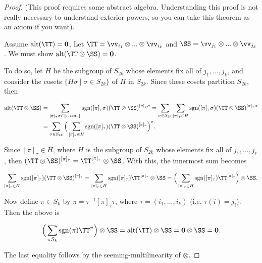 \begin{proof}
    \newcommand{\pit}{[\pi]_\tau}

    (This proof requires some abstract algebra. Understanding this proof is not really necessary to understand exterior powers, so you can take this theorem as an axiom if you want).

    Assume $\alt(\TT) = \mathbf{0}$. Let $\TT = \vv_{i_1} \otimes ... \otimes \vv_{i_{k}}$ and $\SS = \vv_{j_1} \otimes ... \otimes \vv_{j_k}$. We must show $\alt(\TT \otimes \SS) = \mathbf{0}$. 
    
    To do so, let $H$ be the subgroup of $S_{2k}$ whose elements fix all of $j_1, ..., j_k$, and consider the cosets ${\{H \sigma \mid \sigma \in S_{2k}\}}$ of $H$ in $S_{2k}$. Since these cosets partition $S_{2k}$, then
    
    \begin{align*}
        \alt(\TT \otimes \SS) &= \sum_{\pit \sigma \in \{\text{cosets}\}} \text{sgn}({\pit \sigma}) (\TT \otimes \SS)^{\pit \sigma} = \sum_{\sigma \in S_{2k}} \sum_{\pit \in H} \text{sgn}({\pit \sigma}) (\TT \otimes \SS)^{\pit \sigma} \\
        &= \sum_{\sigma \in S_{2k}} \Big(\sum_{\pit \in H} \text{sgn}({\pit}) (\TT \otimes \SS)^{\pit} \Big)^{\sigma}.
    \end{align*}
    
    Since $\pit \in H$, where $H$ is the subgroup of $S_{2k}$ whose elements fix all of $j_1, ..., j_{\ell}$, then $(\TT \otimes \SS)^{\pit} = \TT^{\pit} \otimes \SS$. With this, the innermost sum becomes
    
    \begin{align*}
        \sum_{\pit \in H} \text{sgn}({\pit}) (\TT \otimes \SS)^{\pit} 
        = \sum_{\pit \in H} \text{\sgn}({\pit}) \TT^{\pit} \otimes \SS
        = \Big(\sum_{\pit \in H} \text{sgn}({\pit}) \TT^{\pit}\Big) \otimes \SS.
    \end{align*}
    
    Now define $\pi \in S_{k}$ by $\pi = \tau^{-1} \pit \tau$, where $\tau = (i_1, ..., i_{k})$ (i.e. $\tau(i) = j_i$). Then the above is
    
    \begin{align*}
        \Big(\sum_{\pi S_{k}} \text{sgn}({\pi}) \TT^{\pi}\Big) \otimes \SS 
        = \alt(\TT) \otimes \SS 
        = \mathbf{0} \otimes \SS
        = \mathbf{0}.
    \end{align*}
    
    The last equality follows by the seeming-multilinearity of $\otimes$. 
\end{proof}

